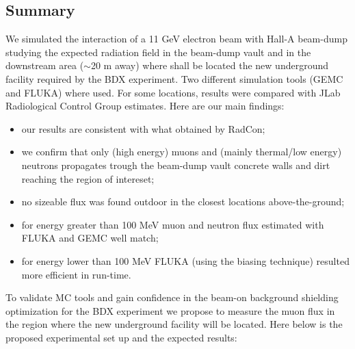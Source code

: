 \subsection{Summary}
We simulated the interaction of a 11 GeV electron beam with Hall-A beam-dump studying the expected  radiation field in the beam-dump vault and in the downstream area ($\sim$20 m away) where shall be located the new underground  facility required by the BDX experiment. Two different  simulation tools (GEMC and FLUKA) where used. For some locations, results were compared with JLab Radiological Control Group estimates. Here are our main findings:
\begin{itemize}
\item{our results are consistent with what obtained by RadCon;}
\item{we confirm that only (high energy) muons and (mainly  thermal/low energy) neutrons propagates trough the beam-dump vault concrete walls  and dirt reaching the region of intereset; }
\item{no sizeable flux was found outdoor in the closest locations above-the-ground;}
\item{for energy greater than 100 MeV muon and neutron flux estimated with FLUKA and GEMC well match;}
\item{for energy lower than 100 MeV  FLUKA (using the biasing technique)  resulted more efficient in run-time. }
\end{itemize}
To validate MC tools and gain confidence in the beam-on background shielding optimization  for the  BDX experiment we propose to measure the muon flux in the region where the new underground facility will be located. 
Here below is the proposed experimental set up and the expected results:
